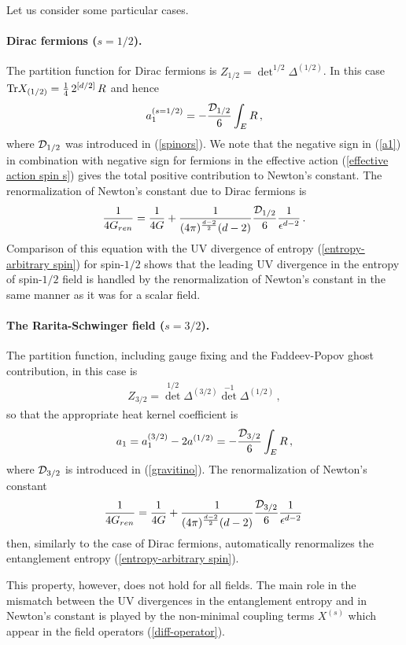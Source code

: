 \documentclass[12pt]{article}
\def\tr{\hbox{Tr}}
\def\be{\begin{eqnarray}}
\def\ee{\end{eqnarray}}
\def\lb{\label}
\def\o{\over}
\begin{document}
\medskip

\noindent Let us consider some particular cases.
\medskip

\paragraph*{ Dirac fermions ($s=1/2$).} The partition function for Dirac fermions is $Z_{1/2}=\det^{1/2}\Delta^{(1/2)}$. In this case $\tr X_{(1/2)}={1\o 4}\, 2^{[d/2]}\,R$ and hence
\be
a_1^{(s=1/2)}=-{{\cal D}_{1/2}\o 6}\int_E R\, ,
\lb{a1}
\ee
where ${\cal D}_{1/2}$ was introduced in (\ref{spinors}). We note that the negative sign in (\ref{a1}) in combination with negative sign for fermions in the effective action 
(\ref{effective action spin s}) gives the total positive contribution to Newton's constant. The renormalization of  Newton's constant due to Dirac fermions is
\be
{1\o 4G_{ren}}={1\o 4G}+{1\o (4\pi)^{d-2 \o 2}(d-2)}  {{\cal D}_{1/2}\o 6}{1\o \epsilon^{d-2}}\, .
\lb{Gren-spin-1/2}
\ee
Comparison of this equation with the UV divergence of entropy (\ref{entropy-arbitrary spin}) for spin-$1/2$ shows that
the leading UV divergence in the entropy of spin-$1/2$ field is handled  by the renormalization of Newton's constant in the same manner as it was for a scalar field.


\paragraph*{The  Rarita-Schwinger field ($s=3/2$).}  The partition function, including gauge fixing and the Faddeev-Popov ghost contribution, in this case is
\be
Z_{3/2}={\det}^{1/2} \Delta^{(3/2)}{\det}^{-1} \Delta^{(1/2)}\, ,
\lb{gravitino partfunction}
\ee
so that  the appropriate heat kernel coefficient is 
\be
a_1=a_1^{(3/2)}-2 a^{(1/2)}=-{{\cal D}_{3/2}\o 6}\int_E R\, ,
\lb{spin-3/2}
\ee
where ${\cal D}_{3/2}$ is introduced in (\ref{gravitino}). The renormalization of Newton's constant
\be
{1\o 4G_{ren}}={1\o 4 G}+{1\o (4\pi)^{d-2 \o 2}(d-2)}  {{\cal D}_{3/2}\o 6}{1\o \epsilon^{d-2}}\, 
\lb{Gren-spin-gravitino}
\ee
then, similarly to the case of Dirac fermions,  automatically renormalizes the entanglement entropy (\ref{entropy-arbitrary spin}). 


\medskip

This property, however, does not  hold for all fields. The main role in the  mismatch between the UV divergences in the entanglement entropy and in Newton's constant
is played by the non-minimal coupling terms $X^{(s)}$  which appear in the  field operators (\ref{diff-operator}).
\end{document}
